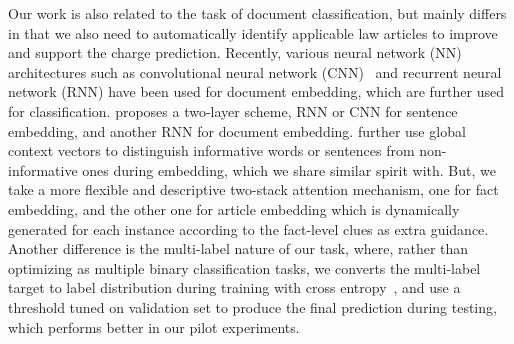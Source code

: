 Our work is also related to the task of document classification, but mainly differs in that we also need to automatically identify applicable law articles to improve and support the charge prediction.
Recently, various neural network (NN) architectures such as convolutional neural network (CNN)~\cite{kim2014convolutional} and recurrent neural network (RNN) have been used for document embedding, which are further used for classification.
\cite{tang2015document} proposes a two-layer scheme, RNN or CNN for sentence embedding, and another RNN for document embedding.
\cite{yang2016hierarchical} further use global context vectors  to distinguish informative words or sentences from non-informative ones during embedding, which we share similar spirit with. 
But, we take a more flexible and descriptive two-stack attention mechanism, one for fact embedding, and the other one for article embedding which is  dynamically generated for each instance according to the fact-level clues as extra guidance.
%
Another difference is the multi-label nature of our task, where, rather than optimizing as multiple binary classification tasks, 
we converts the multi-label target to label distribution during training with cross entropy~\cite{kurata2016improved}, and use a threshold tuned on validation set to produce the final prediction during testing, which performs better  in our pilot experiments.

